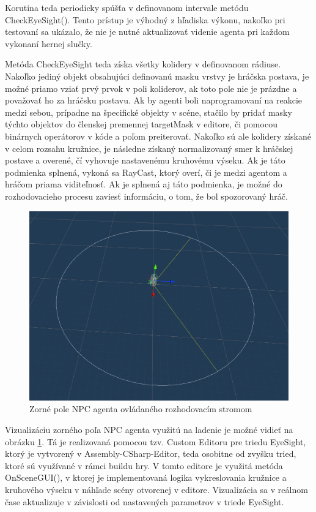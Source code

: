 \documentclass[slovak, master]{diploma}
\begin{document}
Korutina teda periodicky spúšťa v definovanom intervale metódu CheckEyeSight(). Tento prístup je výhodný z hľadiska výkonu, nakoľko pri testovaní sa ukázalo, že nie je nutné aktualizovať videnie agenta pri každom vykonaní hernej slučky. 

Metóda CheckEyeSight teda získa všetky kolidery v definovanom rádiuse. Nakoľko jediný objekt obsahujúci definovanú masku vrstvy je hráčska postava, je možné priamo vziať prvý prvok v poli koliderov, ak toto pole nie je prázdne a považovať ho za hráčsku postavu. Ak by agenti boli naprogramovaní na reakcie medzi sebou, prípadne na špecifické objekty v scéne, stačilo by pridať masky týchto objektov do členskej premennej targetMask v editore, či pomocou binárnych operátorov v kóde a poľom preiterovať. Nakoľko sú ale kolidery získané v celom rozsahu kružnice, je následne získaný normalizovaný smer k hráčskej postave a overené, čí vyhovuje nastavenému kruhovému výseku. Ak je táto podmienka splnená, vykoná sa RayCast, ktorý overí, či je medzi agentom a hráčom priama viditeľnosť. Ak je splnená aj táto podmienka, je možné do rozhodovacieho procesu zaviesť informáciu, o tom, že bol spozorovaný hráč.  

\begin{figure}[!htbp]
    \centering
    \includegraphics[width=.65\textwidth]{Figures/fov.png}
    \caption{Zorné pole NPC agenta ovládaného rozhodovacím stromom}
    \label{pic:FovDecision}
\end{figure}

Vizualizáciu zorného poľa NPC agenta využitú na ladenie je možné vidieť na obrázku \ref{pic:FovDecision}. Tá je realizovaná pomocou tzv. Custom Editoru pre triedu EyeSight, ktorý je vytvorený v Assembly-CSharp-Editor, teda osobitne od zvyšku tried, ktoré sú využívané v rámci buildu hry. V tomto editore je využitá metóda OnSceneGUI(), v ktorej je implementovaná logika vykreslovania kružnice a kruhového výseku v náhľade scény otvorenej v editore. Vizualizácia sa v reálnom čase aktualizuje v závislosti od nastavených parametrov v triede EyeSight.
\end{document}
